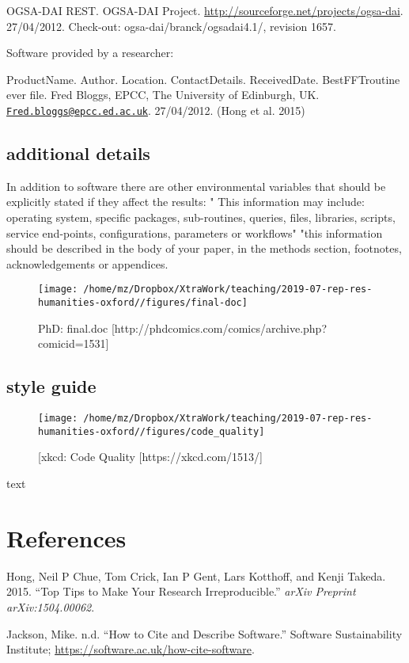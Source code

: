 \documentclass[]{article}
\begin{document}
OGSA-DAI REST. OGSA-DAI Project.
\url{http://sourceforge.net/projects/ogsa-dai}. 27/04/2012. Check-out:
ogsa-dai/branck/ogsadai4.1/, revision 1657.

Software provided by a researcher:

ProductName. Author. Location. ContactDetails. ReceivedDate.
BestFFTroutine ever file. Fred Bloggs, EPCC, The University of
Edinburgh, UK.
\href{mailto:Fred.bloggs@epcc.ed.ac.uk}{\nolinkurl{Fred.bloggs@epcc.ed.ac.uk}}.
27/04/2012. (Hong et al. 2015)

\hypertarget{additional-details}{%
\subsection{additional details}\label{additional-details}}

In addition to software there are other environmental variables that
should be explicitly stated if they affect the results: " This
information may include: operating system, specific packages,
sub-routines, queries, files, libraries, scripts, service end-points,
configurations, parameters or workflows" "this information should be
described in the body of your paper, in the methods section, footnotes,
acknowledgements or appendices.

\begin{figure}
\texttt{[image: /home/mz/Dropbox/XtraWork/teaching/2019-07-rep-res-humanities-oxford//figures/final-doc]} \caption{PhD: final.doc [http://phdcomics.com/comics/archive.php?comicid=1531]}\label{fig:phd}
\end{figure}

\hypertarget{style-guide}{%
\subsection{style guide}\label{style-guide}}

\begin{figure}
\texttt{[image: /home/mz/Dropbox/XtraWork/teaching/2019-07-rep-res-humanities-oxford//figures/code\_quality]} \caption{[xkcd: Code Quality [https://xkcd.com/1513/]}\label{fig:xkcd}
\end{figure}

text

\hypertarget{references}{%
\section*{References}\label{references}}

\hypertarget{refs}{}
\leavevmode\hypertarget{ref-hong2015top}{}%
Hong, Neil P Chue, Tom Crick, Ian P Gent, Lars Kotthoff, and Kenji
Takeda. 2015. ``Top Tips to Make Your Research Irreproducible.''
\emph{arXiv Preprint arXiv:1504.00062}.

\leavevmode\hypertarget{ref-jacksonNodate}{}%
Jackson, Mike. n.d. ``How to Cite and Describe Software.'' Software
Sustainability Institute;
\url{https://software.ac.uk/how-cite-software}.
\end{document}

